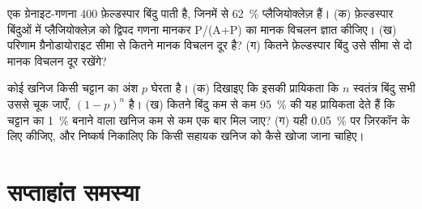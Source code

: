 \begin{exercise}[$\star\star\star$]\label{exo:b2:field-lab-methods-2:11}
एक ग्रेनाइट-गणना 400 फ़ेल्डस्पार बिंदु पाती है, जिनमें से \qty{62}{\percent} प्लैजियोक्लेज़ हैं। (क) फ़ेल्डस्पार बिंदुओं में
प्लैजियोक्लेज़ को द्विपद गणना मानकर
P/(A+P) का मानक विचलन ज्ञात कीजिए। (ख) परिणाम ग्रैनोडायोराइट सीमा से कितने मानक विचलन दूर है? (ग) कितने
फ़ेल्डस्पार बिंदु उसे सीमा से दो मानक विचलन दूर रखेंगे?
\end{exercise}

\begin{exercise}[$\star\star\star$]\label{exo:b2:field-lab-methods-2:12}
कोई खनिज किसी चट्टान का अंश $p$ घेरता है। (क) दिखाइए कि इसकी प्रायिकता कि $n$ स्वतंत्र
बिंदु सभी उससे चूक जाएँ, $(1-p)^n$ है। (ख) कितने बिंदु कम से कम \qty{95}{\percent} की यह प्रायिकता देते हैं कि
चट्टान का \qty{1}{\percent} बनाने वाला खनिज कम से कम एक बार मिल जाए? (ग) यही \qty{0.05}{\percent} पर ज़िरकॉन के लिए
कीजिए, और निष्कर्ष निकालिए कि किसी सहायक खनिज को कैसे खोजा जाना चाहिए।
\end{exercise}

\section*{सप्ताहांत समस्या}

